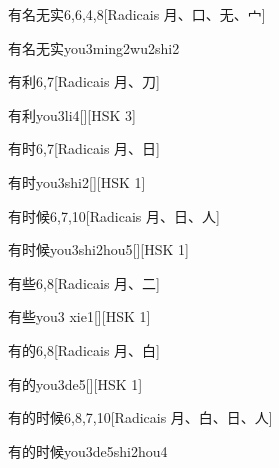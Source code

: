 \begin{entry}{有名无实}{6,6,4,8}[Radicais ⽉、⼝、⽆、⼧]
  \begin{phonetics}{有名无实}{you3ming2wu2shi2}
  \end{phonetics}
\end{entry}

\begin{entry}{有利}{6,7}[Radicais ⽉、⼑]
  \begin{phonetics}{有利}{you3li4}[][HSK 3]
  \end{phonetics}
\end{entry}

\begin{entry}{有时}{6,7}[Radicais ⽉、⽇]
  \begin{phonetics}{有时}{you3shi2}[][HSK 1]
  \end{phonetics}
\end{entry}

\begin{entry}{有时候}{6,7,10}[Radicais ⽉、⽇、⼈]
  \begin{phonetics}{有时候}{you3shi2hou5}[][HSK 1]
  \end{phonetics}
\end{entry}

\begin{entry}{有些}{6,8}[Radicais ⽉、⼆]
  \begin{phonetics}{有些}{you3 xie1}[][HSK 1]
  \end{phonetics}
\end{entry}

\begin{entry}{有的}{6,8}[Radicais ⽉、⽩]
  \begin{phonetics}{有的}{you3de5}[][HSK 1]
  \end{phonetics}
\end{entry}

\begin{entry}{有的时候}{6,8,7,10}[Radicais ⽉、⽩、⽇、⼈]
  \begin{phonetics}{有的时候}{you3de5shi2hou4}
  \end{phonetics}
\end{entry}

